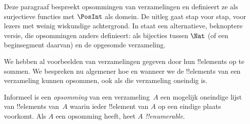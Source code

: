 \documentclass[../../../include/open-logic-section]{subfiles}
\begin{document}


\begin{editorial}
  Deze paragraaf bespreekt opsommingen van verzamelingen en definieert
  ze als surjectieve functies met $\PosInt$ als domein. De uitleg gaat stap voor stap,
  voor lezers met weinig wiskundige achtergrond. In
   staat een alternatieve, beknoptere versie, die
  opsommingen anders definieert: als bijecties tussen $\Nat$ (of een
  beginsegment daarvan) en de opgesomde verzameling.
\end{editorial}

\begin{explain}
We hebben al voorbeelden van verzamelingen gegeven door hun
!!{element}s op te sommen. We bespreken nu algemener hoe en wanneer
we de !!{element}s van een verzameling kunnen opsommen, ook als die
verzameling oneindig is.
\end{explain}

\begin{defn}
Informeel is een \emph{opsomming} van een verzameling~$A$ een mogelijk
oneindige lijst van !!{element}s van~$A$ waarin ieder !!{element} van $A$
op een eindige plaats voorkomt. Als $A$ een opsomming heeft, heet $A$
\emph{!!{enumerable}}.
\end{defn}
\end{document}
